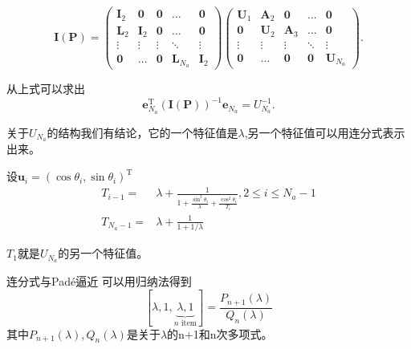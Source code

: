 \documentclass[notheorems,xetex]{beamer}
\theoremstyle{definition}
\begin{document}
\begin{frame}[noframenumbering]
\begin{equation*}\label{eq:LU}
  \bm{I}(\bm{P})=\begin{pmatrix}
                 \bm{I}_2 & \bm{0} & \bm{0} & \dots & \bm{0} \\
                 \bm{L}_2 & \bm{I}_2 & \bm{0} & \dots & \bm{0} \\
                 \vdots & \vdots & \vdots & \ddots & \vdots \\
                 \bm{0} & \dots & \bm{0} & \bm{L}_{N_a} & \bm{I}_{2}
               \end{pmatrix}\begin{pmatrix}
                 \bm{U}_1 & \bm{A}_2 & \bm{0} & \dots & \bm{0} \\
                 \bm{0} & \bm{U}_2 & \bm{A}_3 & \dots & \bm{0} \\
                 \vdots & \vdots & \vdots & \ddots & \vdots \\
                 \bm{0} & \dots & \bm{0} & \bm{0} & \bm{U}_{N_a}
               \end{pmatrix}.
\end{equation*}

从上式可以求出
\begin{equation*}\label{eq:thomas_final}
\bm{e}_{N_a}^{\textrm{T}}(\bm{I}(\bm{P}))^{-1}\bm{e}_{N_a}=U_{N_a}^{-1}.
\end{equation*}
\pause

关于$U_{N_a}$的结构我们有结论，它的一个特征值是$\lambda$,另一个特征值可以用连分式表示出来。
\end{frame}
\begin{frame}[noframenumbering]
设$\bm{u}_i=(\cos\theta_i,\sin\theta_i)^{\textrm{T}}$
\begin{equation*}
\begin{split}
T_{i-1} =& \lambda + \frac{1}{1+\frac{\sin^2\theta_i}{\lambda}+\frac{\cos^2\theta_i}{T_i}},2\leq i\leq N_a-1\\
T_{N_a-1}  =& \lambda+\frac{1}{1+1/\lambda}
\end{split}
\end{equation*}

$T_1$就是$U_{N_a}$的另一个特征值。
\end{frame}
\begin{frame}[noframenumbering]{连分式与Pad\'e逼近}
可以用归纳法得到
\[
[\lambda,1,\underbrace{\lambda,1}_{\text{$n$ item}}]=\frac{P_{n+1}(\lambda)}{Q_n(\lambda)}
\]
其中$P_{n+1}(\lambda),Q_n(\lambda)$是关于$\lambda$的n+1和n次多项式。
\end{frame}
\end{document}
